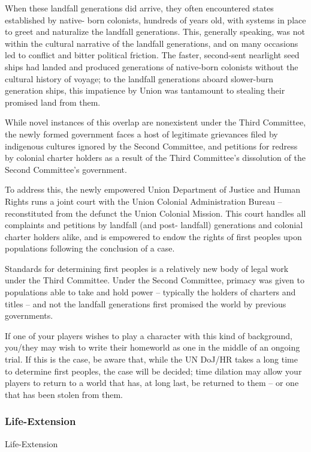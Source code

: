 When these landfall generations did arrive, they often encountered states established by native-
born colonists, hundreds of years old, with systems in place to greet and naturalize the landfall
generations. This, generally speaking, was not within the cultural narrative of the landfall
generations, and on many occasions led to conflict and bitter political friction. The faster,
second-sent nearlight seed ships had landed and produced generations of native-born colonists
without the cultural history of voyage; to the landfall generations aboard slower-burn generation
ships, this impatience by Union was tantamount to stealing their promised land from them.


While novel instances of this overlap are nonexistent under the Third Committee, the newly
formed government faces a host of legitimate grievances filed by indigenous cultures ignored by
the Second Committee, and petitions for redress by colonial charter holders as a result of the
Third Committee’s dissolution of the Second Committee’s government.


To address this, the newly empowered Union Department of Justice and Human Rights runs a
joint court with the Union Colonial Administration Bureau -- reconstituted from the defunct the
Union Colonial Mission. This court handles all complaints and petitions by landfall (and post-
landfall) generations and colonial charter holders alike, and is empowered to endow the rights of
first peoples upon populations following the conclusion of a case.


Standards for determining first peoples is a relatively new body of legal work under the Third
Committee. Under the Second Committee, primacy was given to populations able to take and
hold power -- typically the holders of charters and titles -- and not the landfall generations first
promised the world by previous governments.

If one of your players wishes to play a character with this kind of background, you/they may wish
to write their homeworld as one in the middle of an ongoing trial. If this is the case, be aware
that, while the UN DoJ/HR takes a long time to determine first peoples, the case will be decided;
time dilation may allow your players to return to a world that has, at long last, be returned to
them -- or one that has been stolen from them.
\subsubsection{Life-Extension}
Life-Extension

